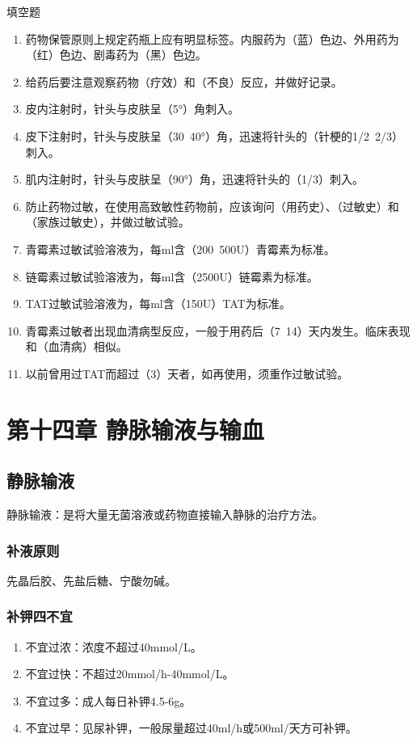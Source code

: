 \documentclass[11pt, a4paper]{ctexart}
\begin{document}
\begin{tipsbox}{填空题}
\begin{enumerate}
    \item 药物保管原则上规定药瓶上应有明显标签。内服药为（蓝）色边、外用药为（红）色边、剧毒药为（黑）色边。
    \item 给药后要注意观察药物（疗效）和（不良）反应，并做好记录。
    \item 皮内注射时，针头与皮肤呈（5°）角刺入。
    \item 皮下注射时，针头与皮肤呈（30~40°）角，迅速将针头的（针梗的1/2~2/3）刺入。
    \item 肌内注射时，针头与皮肤呈（90°）角，迅速将针头的（1/3）刺入。
    \item 防止药物过敏，在使用高致敏性药物前，应该询问（用药史）、（过敏史）和（家族过敏史），并做过敏试验。
    \item 青霉素过敏试验溶液为，每ml含（200~500U）青霉素为标准。
    \item 链霉素过敏试验溶液为，每ml含（2500U）链霉素为标准。
    \item TAT过敏试验溶液为，每ml含（150U）TAT为标准。
    \item 青霉素过敏者出现血清病型反应，一般于用药后（7~14）天内发生。临床表现和（血清病）相似。
    \item 以前曾用过TAT而超过（3）天者，如再使用，须重作过敏试验。
\end{enumerate}
\end{tipsbox}

\section{第十四章 静脉输液与输血}
\subsection{静脉输液}
静脉输液：是将大量无菌溶液或药物直接输入静脉的治疗方法。

\subsubsection{补液原则}
先晶后胶、先盐后糖、宁酸勿碱。

\subsubsection{补钾四不宜}
\begin{enumerate}
    \item 不宜过浓：浓度不超过40mmol/L。
    \item 不宜过快：不超过20mmol/h-40mmol/L。
    \item 不宜过多：成人每日补钾4.5-6g。
    \item 不宜过早：见尿补钾，一般尿量超过40ml/h或500ml/天方可补钾。
\end{enumerate}
\end{document}
